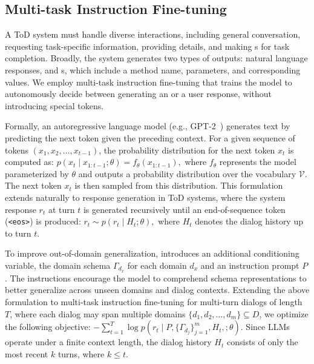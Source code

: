 \vspace{-3pt}
\subsection{Multi-task Instruction Fine-tuning}
A ToD system must handle diverse interactions, including general conversation, requesting task-specific information, providing details, and making {\apicall}s for task completion. Broadly, the system generates two types of outputs:  natural language responses, and  {\apicall}s, which include a method name, parameters, and corresponding values. We employ multi-task instruction fine-tuning that trains the model to autonomously decide between generating an {\apicall} or a user response, without introducing special tokens.


Formally, an autoregressive language model (e.g., GPT-2~\cite{radford2019language}) generates text by predicting the next token given the preceding context. For a given sequence of tokens \( (x_1, x_2, \ldots, x_{t-1}) \), the probability distribution for the next token \( x_t \) is computed as:  \(
p(x_t \mid x_{1:t-1}; \theta) = f_{\theta}(x_{1:t-1}),
\)
where \( f_{\theta} \) represents the model parameterized by \( \theta \) and outputs a probability distribution over the vocabulary \( \mathcal{V} \). The next token \( x_t \) is then sampled from this distribution.  
This formulation extends naturally to response generation in ToD systems, where the system response \( r_t \) at turn \( t \) is generated recursively until an end-of-sequence token (\texttt{<eos>}) is produced:  \(
    r_t \sim p(r_t \mid H_t; \theta),
\)
where \( H_t \) denotes the dialog history up to turn \( t \).  



To improve out-of-domain generalization, {\oursys} introduces an additional conditioning variable, the domain schema \( \Gamma_{d_x} \) for each domain \( d_x \) and an instruction prompt \( P \). 
The instructions encourage the model to comprehend schema representations to better generalize across unseen domains and dialog contexts. 
Extending the above formulation to multi-task instruction fine-tuning for multi-turn dialogs of length \( T \), where each dialog may span multiple domains \( \{d_1, d_2, \dots, d_m\} \subseteq D \), we optimize the following objective:  
\( - \sum_{t=1}^{T} \log p(r_t \mid P, \{\Gamma_{d_j}\}_{j=1}^{m}, H_t,; \theta).
\)
Since LLMs operate under a finite context length, the dialog history \( H_t \) consists of only the most recent \( k \) turns, where \( k \leq t \).




